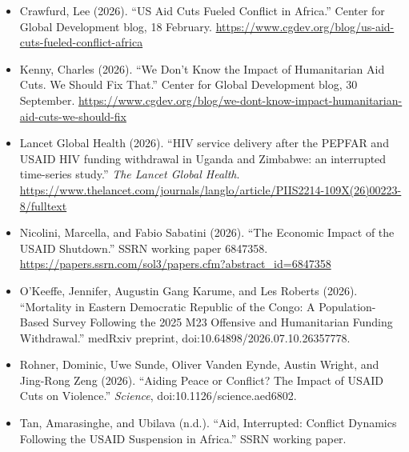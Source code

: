 \documentclass[11pt]{article}
\newcommand{\hd}[1]{\par\bigskip{\sffamily\large\bfseries\color{navy}#1}\par\smallskip}
\begin{document}
\hd{References}
{\small
\begin{itemize}[leftmargin=1.2em,itemsep=1pt]
  \item Crawfurd, Lee (2026). ``US Aid Cuts Fueled Conflict in Africa.'' Center for Global Development blog, 18 February. \url{https://www.cgdev.org/blog/us-aid-cuts-fueled-conflict-africa}
  \item Kenny, Charles (2026). ``We Don't Know the Impact of Humanitarian Aid Cuts. We Should Fix That.'' Center for Global Development blog, 30 September. \url{https://www.cgdev.org/blog/we-dont-know-impact-humanitarian-aid-cuts-we-should-fix}
  \item Lancet Global Health (2026). ``HIV service delivery after the PEPFAR and USAID HIV funding withdrawal in Uganda and Zimbabwe: an interrupted time-series study.'' \textit{The Lancet Global Health}. \url{https://www.thelancet.com/journals/langlo/article/PIIS2214-109X(26)00223-8/fulltext}
  \item Nicolini, Marcella, and Fabio Sabatini (2026). ``The Economic Impact of the USAID Shutdown.'' SSRN working paper 6847358. \url{https://papers.ssrn.com/sol3/papers.cfm?abstract_id=6847358}
  \item O'Keeffe, Jennifer, Augustin Gang Karume, and Les Roberts (2026). ``Mortality in Eastern Democratic Republic of the Congo: A Population-Based Survey Following the 2025 M23 Offensive and Humanitarian Funding Withdrawal.'' medRxiv preprint, doi:10.64898/2026.07.10.26357778.
  \item Rohner, Dominic, Uwe Sunde, Oliver Vanden Eynde, Austin Wright, and Jing-Rong Zeng (2026). ``Aiding Peace or Conflict? The Impact of USAID Cuts on Violence.'' \textit{Science}, doi:10.1126/science.aed6802.
  \item Tan, Amarasinghe, and Ubilava (n.d.). ``Aid, Interrupted: Conflict Dynamics Following the USAID Suspension in Africa.'' SSRN working paper.
\end{itemize}}

\clearpage
\appendix
\hd{Appendix A. Data}
\end{document}
